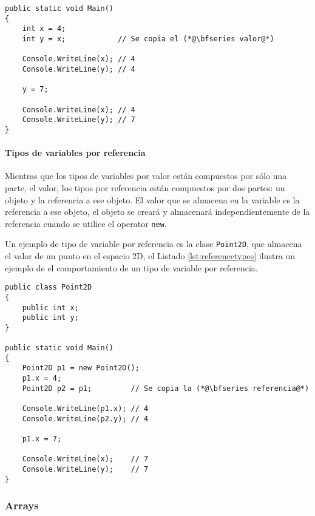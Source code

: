 \documentclass{pre-tfg}
\begin{document}
\begin{spacing}{1}
\begin{lstlisting}[float=htbp, caption=Ejemplo de tipo de variable por valor, label=lst:valuedtypes]
public static void Main()
{
	int x = 4;	
	int y = x;            // Se copia el (*@\bfseries valor@*)
	
	Console.WriteLine(x); // 4
	Console.WriteLine(y); // 4
	
	y = 7;
		
	Console.WriteLine(x); // 4
	Console.WriteLine(y); // 7
}
\end{lstlisting}
\end{spacing}

\paragraph{Tipos de variables por referencia}

Mientras que los tipos de variables por valor están compuestos por sólo una parte, el valor, los tipos por referencia están compuestos por dos partes: un objeto y la referencia a ese objeto. El valor que se almacena en la variable es la referencia a ese objeto, el objeto se creará y almacenará independientemente de la referencia cuando se utilice el operator \texttt{new}.

Un ejemplo de tipo de variable por referencia es la clase \texttt{Point2D}, que almacena el valor de un punto en el espacio 2D, el Listado \ref{lst:referencetypes} ilustra un ejemplo de el comportamiento de un tipo de variable por referencia.

\begin{spacing}{1}
\begin{lstlisting}[float=htbp, caption=Ejemplo de tipo de variable por referencia, label=lst:referencetypes]
public class Point2D 
{ 
	public int x;
	public int y;
}

public static void Main()
{
	Point2D p1 = new Point2D();
	p1.x = 4;
	Point2D p2 = p1;         // Se copia la (*@\bfseries referencia@*)
	
	Console.WriteLine(p1.x); // 4
	Console.WriteLine(p2.y); // 4
	
	p1.x = 7;
		
	Console.WriteLine(x);    // 7
	Console.WriteLine(y);    // 7
}
\end{lstlisting}
\end{spacing}

\subsubsection{Arrays}
\end{document}
